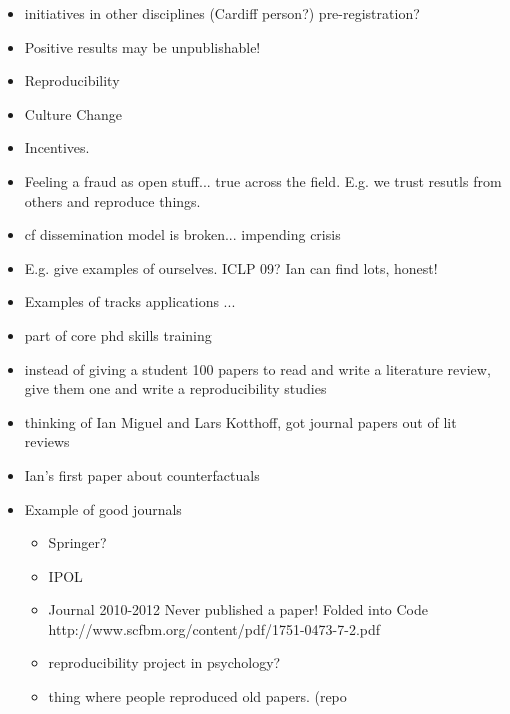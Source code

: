 \documentclass{article}
\begin{document}
\begin{itemize}


\item initiatives in other disciplines (Cardiff person?) pre-registration?
\item Positive results may be unpublishable!   

\item Reproducibility

\item Culture Change 
\item Incentives.  

\item Feeling a fraud as open stuff... true across the field.  E.g. we trust resutls from others and reproduce things.

\item cf dissemination model is broken... impending crisis

\item E.g. give examples of ourselves.   ICLP 09?  Ian can find lots, honest!

\item Examples of tracks applications ... 

\item part of core phd skills training
\item instead of giving a student 100 papers to read and write a literature review, give them one and write a reproducibility studies
\item thinking of Ian Miguel and Lars Kotthoff, got journal papers out of lit reviews
\item Ian's first paper about counterfactuals





\item Example of good journals
\begin{itemize}
\item Springer?
\item IPOL
\item
Journal 2010-2012
Never published a paper!
Folded into Code 
http://www.scfbm.org/content/pdf/1751-0473-7-2.pdf

\item reproducibility project in psychology?

\item thing where people reproduced old papers.  (repo 

\end{itemize}



\end{itemize}
\end{document}
